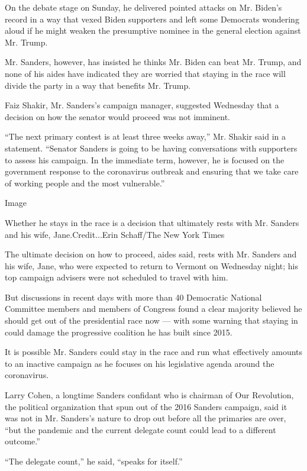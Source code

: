 On the debate stage on Sunday, he delivered pointed attacks on Mr.
Biden's record in a way that vexed Biden supporters and left some
Democrats wondering aloud if he might weaken the presumptive nominee in
the general election against Mr. Trump.

Mr. Sanders, however, has insisted he thinks Mr. Biden can beat Mr.
Trump, and none of his aides have indicated they are worried that
staying in the race will divide the party in a way that benefits Mr.
Trump.

Faiz Shakir, Mr. Sanders's campaign manager, suggested Wednesday that a
decision on how the senator would proceed was not imminent.

``The next primary contest is at least three weeks away,'' Mr. Shakir
said in a statement. ``Senator Sanders is going to be having
conversations with supporters to assess his campaign. In the immediate
term, however, he is focused on the government response to the
coronavirus outbreak and ensuring that we take care of working people
and the most vulnerable.''

Image

Whether he stays in the race is a decision that ultimately rests with
Mr. Sanders and his wife, Jane.Credit...Erin Schaff/The New York Times

The ultimate decision on how to proceed, aides said, rests with Mr.
Sanders and his wife, Jane, who were expected to return to Vermont on
Wednesday night; his top campaign advisers were not scheduled to travel
with him.

But discussions in recent days with more than 40 Democratic National
Committee members and members of Congress found a clear majority
believed he should get out of the presidential race now --- with some
warning that staying in could damage the progressive coalition he has
built since 2015.

It is possible Mr. Sanders could stay in the race and run what
effectively amounts to an inactive campaign as he focuses on his
legislative agenda around the coronavirus.

Larry Cohen, a longtime Sanders confidant who is chairman of Our
Revolution, the political organization that spun out of the 2016 Sanders
campaign, said it was not in Mr. Sanders's nature to drop out before all
the primaries are over, ``but the pandemic and the current delegate
count could lead to a different outcome.''

``The delegate count,'' he said, ``speaks for itself.''

